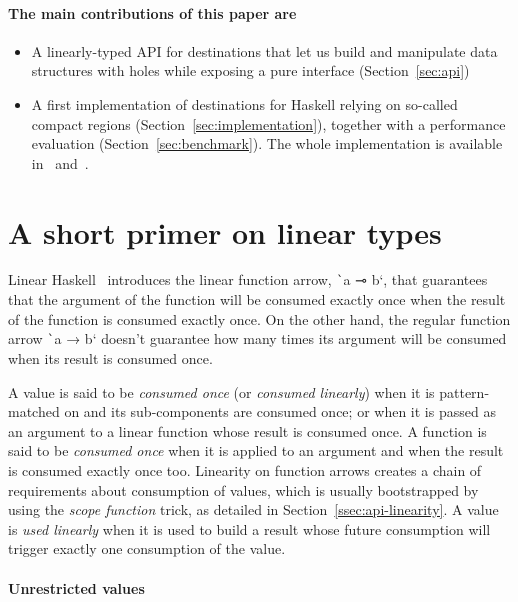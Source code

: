 \documentclass[english]{jflart}
\begin{document}
\paragraph{The main contributions of this paper are}
\begin{itemize}
\item A linearly-typed API for destinations that let us build and manipulate data structures with holes while exposing a pure interface (Section~\ref{sec:api})
\item A first implementation of destinations for Haskell relying on so-called compact regions (Section~\ref{sec:implementation}), together with a performance evaluation (Section~\ref{sec:benchmark}). The whole implementation is available in~\cite{custom_ghc} and~\cite{linear_dest}.
\end{itemize}

\section{A short primer on linear types}\label{sec:intro-linearity}

Linear Haskell~\cite{bernardy_linear_2018} introduces the linear function arrow, \texttt`a ⊸ b`, that guarantees that the argument of the function will be consumed exactly once when the result of the function is consumed exactly once. On the other hand, the regular function arrow \texttt`a → b` doesn't guarantee how many times its argument will be consumed when its result is consumed once.

A value is said to be \emph{consumed once} (or \emph{consumed linearly}) when it is pattern-matched on and its sub-components are consumed once; or when it is passed as an argument to a linear function whose result is consumed once. A function is said to be \emph{consumed once} when it is applied to an argument and when the result is consumed exactly once too. Linearity on function arrows creates a chain of requirements about consumption of values, which is usually bootstrapped by using the \emph{scope function} trick, as detailed in Section~\ref{ssec:api-linearity}. A value is \emph{used linearly} when it is used to build a result whose future consumption will trigger exactly one consumption of the value.

\paragraph{Unrestricted values}
\end{document}
